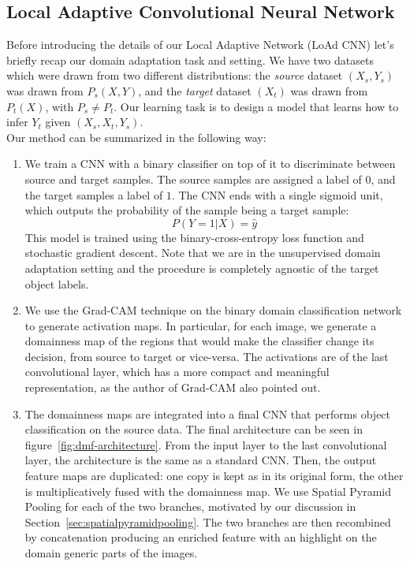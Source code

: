 \documentclass[../main.tex]{subfiles}
\begin{document}
    \subsection{Local Adaptive Convolutional Neural Network}
    Before introducing the details of our Local Adaptive Network (LoAd CNN) let's briefly recap our domain adaptation task and setting.
    We have two datasets which were drawn
    from two different distributions: the \textit{source} dataset $(X_{s}, Y_{s})$ was drawn from $P_{s}(X, Y)$, and the \textit{target}
    dataset $(X_{t})$ was drawn from $P_{t}(X)$, with $P_{s} \neq P_{t}$. Our learning task is to design a model that learns how to infer
    $Y_{t}$ given $(X_{s}, X_{t}, Y_{s})$. \\
    Our method can be summarized in the following way:
    \begin{enumerate}
        \item We train a CNN with a binary classifier on top of it to discriminate between source and target samples. The source samples are
            assigned a label of $0$, and the target samples a label of $1$. The CNN ends with a single sigmoid unit, which outputs the
            probability of the sample being a target sample:
            $$ P(Y = 1 | X) = \hat{y} $$
            This model is trained using the binary-cross-entropy loss function and stochastic gradient descent. Note that we are in the unsupervised
            domain adaptation setting and the procedure is completely agnostic of the target object labels.
        \item We use the Grad-CAM technique on the binary domain classification network to generate activation maps\@. In particular,
            for each image, we generate a domainness map of the regions that would make the classifier change its decision, from source to target or
            vice-versa. The activations are of the last convolutional layer, which has a more compact and meaningful representation, as the author
            of Grad-CAM also pointed out.
        \item The domainness maps are integrated into a final CNN that performs object classification on the source data. The final architecture can be seen in figure~\ref{fig:dmf-architecture}.
            From the input layer to the last convolutional layer, the architecture is the same as a standard CNN\@. Then, the output
            feature maps are duplicated: one copy is kept as in its original form, the other is multiplicatively fused with the domainness map.
            We use Spatial Pyramid Pooling for each of the two branches, motivated by our discussion in Section~\ref{sec:spatialpyramidpooling}.
            The two branches are then recombined by concatenation producing an enriched feature with an highlight on the domain generic parts of the images.
    \end{enumerate}
\end{document}
